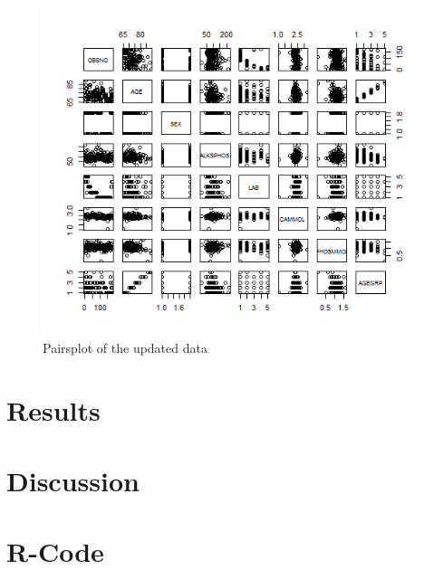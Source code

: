 \documentclass{article}
\begin{document}
    \begin{figure}[H]
        \centering
        \includegraphics[scale=0.5]{../results/SecondPairs.png}
        \caption{Pairsplot of the updated data}
        \label{fig:SecondPairs}
    \end{figure}

  \section{Results}

  \section{Discussion}
    
  \section{R-Code}
    \begin{lstlisting}[language=R]
    \end{lstlisting}
\end{document}
